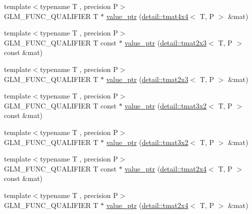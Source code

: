 \begin{DoxyCompactItemize}
\item 
{\footnotesize template$<$typename T , precision P$>$ }\\G\+L\+M\+\_\+\+F\+U\+N\+C\+\_\+\+Q\+U\+A\+L\+I\+F\+I\+ER T $\ast$ \hyperlink{group__gtc__type__ptr_ga46c85fe444b7260c496be5fe0c146e87}{value\+\_\+ptr} (\hyperlink{structglm_1_1detail_1_1tmat4x4}{detail\+::tmat4x4}$<$ T, P $>$ \&mat)
\item 
{\footnotesize template$<$typename T , precision P$>$ }\\G\+L\+M\+\_\+\+F\+U\+N\+C\+\_\+\+Q\+U\+A\+L\+I\+F\+I\+ER T const $\ast$ \hyperlink{group__gtc__type__ptr_gad5c4faad7a4553c875bc45656fcae73c}{value\+\_\+ptr} (\hyperlink{structglm_1_1detail_1_1tmat2x3}{detail\+::tmat2x3}$<$ T, P $>$ const \&mat)
\item 
{\footnotesize template$<$typename T , precision P$>$ }\\G\+L\+M\+\_\+\+F\+U\+N\+C\+\_\+\+Q\+U\+A\+L\+I\+F\+I\+ER T $\ast$ \hyperlink{group__gtc__type__ptr_gaaba8179ff5559d8b4493499313eb7a02}{value\+\_\+ptr} (\hyperlink{structglm_1_1detail_1_1tmat2x3}{detail\+::tmat2x3}$<$ T, P $>$ \&mat)
\item 
{\footnotesize template$<$typename T , precision P$>$ }\\G\+L\+M\+\_\+\+F\+U\+N\+C\+\_\+\+Q\+U\+A\+L\+I\+F\+I\+ER T const $\ast$ \hyperlink{group__gtc__type__ptr_gaf8edbe29063a5b8221fc8afcb6af224d}{value\+\_\+ptr} (\hyperlink{structglm_1_1detail_1_1tmat3x2}{detail\+::tmat3x2}$<$ T, P $>$ const \&mat)
\item 
{\footnotesize template$<$typename T , precision P$>$ }\\G\+L\+M\+\_\+\+F\+U\+N\+C\+\_\+\+Q\+U\+A\+L\+I\+F\+I\+ER T $\ast$ \hyperlink{group__gtc__type__ptr_gae2e604002202417c7156db3deeb1301d}{value\+\_\+ptr} (\hyperlink{structglm_1_1detail_1_1tmat3x2}{detail\+::tmat3x2}$<$ T, P $>$ \&mat)
\item 
{\footnotesize template$<$typename T , precision P$>$ }\\G\+L\+M\+\_\+\+F\+U\+N\+C\+\_\+\+Q\+U\+A\+L\+I\+F\+I\+ER T const $\ast$ \hyperlink{group__gtc__type__ptr_ga7b738eac576043c00c39bda2fc515d7b}{value\+\_\+ptr} (\hyperlink{structglm_1_1detail_1_1tmat2x4}{detail\+::tmat2x4}$<$ T, P $>$ const \&mat)
\item 
{\footnotesize template$<$typename T , precision P$>$ }\\G\+L\+M\+\_\+\+F\+U\+N\+C\+\_\+\+Q\+U\+A\+L\+I\+F\+I\+ER T $\ast$ \hyperlink{group__gtc__type__ptr_ga59b17271f4f487e556383b715f9b8534}{value\+\_\+ptr} (\hyperlink{structglm_1_1detail_1_1tmat2x4}{detail\+::tmat2x4}$<$ T, P $>$ \&mat)

\end{DoxyCompactItemize}
